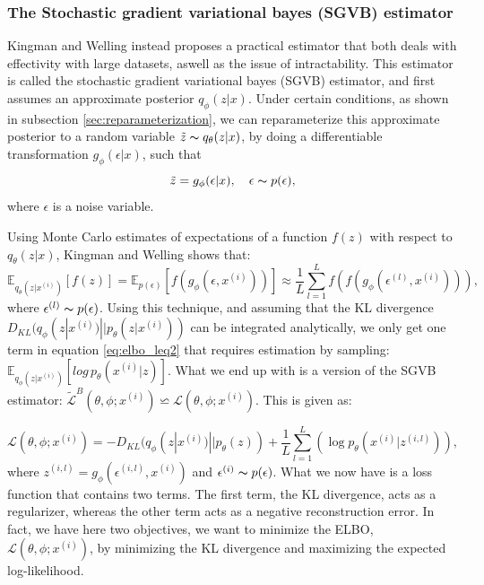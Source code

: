 \subsubsection*{The Stochastic gradient variational bayes (SGVB) estimator}
Kingman and Welling \cite{VAE} instead proposes a practical estimator that both deals with effectivity with large datasets, aswell as the 
issue of intractability. This estimator is called the stochastic gradient variational bayes (SGVB) estimator, and first assumes an approximate 
posterior $q_{\phi}(z|x)$. Under certain conditions, as shown in subsection \ref{sec:reparameterization}, we can reparameterize this approximate
posterior to a random variable $\tilde{z} \thicksim q_{\theta}(z|x)$, by doing a differentiable transformation $g_{\phi}(\epsilon|x)$, such that 
\begin{equation*}
    \tilde{z} = g_{\phi}(\epsilon|x), \quad \epsilon \thicksim p(\epsilon),
\end{equation*}
where $\epsilon$ is a noise variable.\par 
Using Monte Carlo estimates of expectations of a function $f(z)$ with respect to $q_{\theta}(z|x)$, Kingman and Welling \cite{VAE} shows that:
\begin{equation}
    \mathbb{E}_{q_{\theta}(z|x^{(i)})}[f(z)] = \mathbb{E}_{p(\epsilon)}[f(g_{\phi}(\epsilon, x^{(i)}))] \approx \frac{1}{L}\sum_{l=1}^{L}f(f(g_{\phi}(\epsilon^{(l)}, x^{(i)}))),
\end{equation}
where $\epsilon^{(l)} \thicksim p(\epsilon)$. Using this technique, and assuming that the KL divergence 
$D_{KL}(q_{\phi}(z|x^{(i)})||p_{\theta}(z|x^{(i)}))$ can be integrated analytically, we only get one term in 
equation \ref{eq:elbo_leq2} that requires estimation by sampling: $\mathbb{E}_{q_{\phi}(z|x^{(i)})}[log\, p_{\theta}(x^{(i)}|z)]$. 
What we end up with is a version of the SGVB estimator: $\tilde{\mathcal{L}}^{B}(\theta, \phi; x^{(i)}) \backsimeq 
\mathcal{L}(\theta, \phi; x^{(i)})$. This is given as:

\begin{equation}
    \mathcal{L}(\theta, \phi; x^{(i)}) = -D_{KL}(q_{\phi}(z|x^{(i)})||p_{\theta}(z)) + \frac{1}{L}\sum_{l=1}^{L} (\log p_{\theta}(x^{(i)}|z^{(i,l)})),
\end{equation}
where $z^{(i,l)} = g_{\phi}(\epsilon^{(i,l)}, x^{(i)})$ and $\epsilon^{(i)} \thicksim p(\epsilon)$. What we now have is a loss function that contains two terms. 
The first term, the KL divergence, acts as a regularizer, whereas the other term acts as a negative reconstruction error. In fact, we have here two objectives, 
we want to minimize the ELBO, $\mathcal{L}(\theta, \phi; x^{(i)})$, by minimizing the KL divergence and maximizing the expected log-likelihood. 

